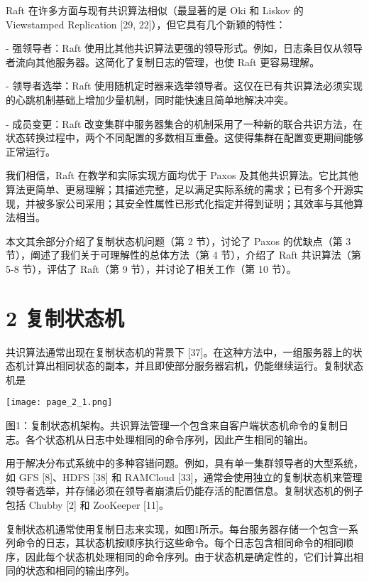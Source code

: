 \documentclass[12pt,a4paper]{report} %
\begin{document}
Raft 在许多方面与现有共识算法相似（最显著的是 Oki 和 Liskov 的 Viewstamped Replication [29, 22]），但它具有几个新颖的特性：

- 强领导者：Raft 使用比其他共识算法更强的领导形式。例如，日志条目仅从领导者流向其他服务器。这简化了复制日志的管理，也使 Raft 更容易理解。

- 领导者选举：Raft 使用随机定时器来选举领导者。这仅在已有共识算法必须实现的心跳机制基础上增加少量机制，同时能快速且简单地解决冲突。

- 成员变更：Raft 改变集群中服务器集合的机制采用了一种新的联合共识方法，在状态转换过程中，两个不同配置的多数相互重叠。这使得集群在配置变更期间能够正常运行。

我们相信，Raft 在教学和实际实现方面均优于 Paxos 及其他共识算法。它比其他算法更简单、更易理解；其描述完整，足以满足实际系统的需求；已有多个开源实现，并被多家公司采用；其安全性属性已形式化指定并得到证明；其效率与其他算法相当。

本文其余部分介绍了复制状态机问题（第 2 节），讨论了 Paxos 的优缺点（第 3 节），阐述了我们关于可理解性的总体方法（第 4 节），介绍了 Raft 共识算法（第 5-8 节），评估了 Raft（第 9 节），并讨论了相关工作（第 10 节）。

\section*{2 复制状态机}

共识算法通常出现在复制状态机的背景下 [37]。在这种方法中，一组服务器上的状态机计算出相同状态的副本，并且即使部分服务器宕机，仍能继续运行。复制状态机是
\begin{center}
\texttt{[image: page\_2\_1.png]}
\end{center}
\begin{center} 图1：复制状态机架构。共识算法管理一个包含来自客户端状态机命令的复制日志。各个状态机从日志中处理相同的命令序列，因此产生相同的输出。

\end{center} 用于解决分布式系统中的多种容错问题。例如，具有单一集群领导者的大型系统，如 GFS [8]、HDFS [38] 和 RAMCloud [33]，通常会使用独立的复制状态机来管理领导者选举，并存储必须在领导者崩溃后仍能存活的配置信息。复制状态机的例子包括 Chubby [2] 和 ZooKeeper [11]。

复制状态机通常使用复制日志来实现，如图1所示。每台服务器存储一个包含一系列命令的日志，其状态机按顺序执行这些命令。每个日志包含相同命令的相同顺序，因此每个状态机处理相同的命令序列。由于状态机是确定性的，它们计算出相同的状态和相同的输出序列。
\end{document}
